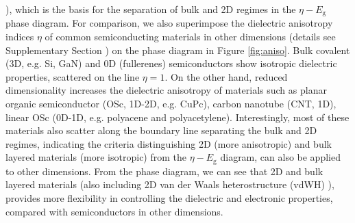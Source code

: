 \documentclass[journal=ancac3,manuscript=article,email=true,hyperref=true,keywords=false]{achemso}
\begin{document}
), which is the basis for the separation of bulk and 2D
regimes in the $\eta-E_{\mathrm{g}}$ phase diagram.  For comparison,
we also superimpose the dielectric anisotropy indices $\eta$ of common
semiconducting materials in other dimensions (details see
Supplementary Section ) on the phase diagram in Figure
\ref{fig:aniso}. Bulk covalent (3D, e.g. Si, GaN) and 0D (fullerenes)
semiconductors show isotropic dielectric properties, scattered on the
line $\eta=1$. On the other hand, reduced dimensionality increases the
dielectric anisotropy of materials such as planar organic
semiconductor (OSc, 1D-2D, e.g. CuPc), carbon nanotube (CNT, 1D),
linear OSc (0D-1D, e.g. polyacene and polyacetylene). Interestingly,
most of these materials also scatter along the boundary line
separating the bulk and 2D regimes, indicating the criteria
distinguishing 2D (more anisotropic) and bulk layered materials (more
isotropic) from the $\eta-E_{\mathrm{g}}$ diagram, can also be applied
to other dimensions. From the phase diagram, we can see that 2D and
bulk layered materials (also including 2D van der Waals
heterostructure (vdWH) \cite{Novoselov_2016}), provides more
flexibility in controlling the dielectric and electronic properties,
compared with semiconductors in other dimensions.  
\end{document}
